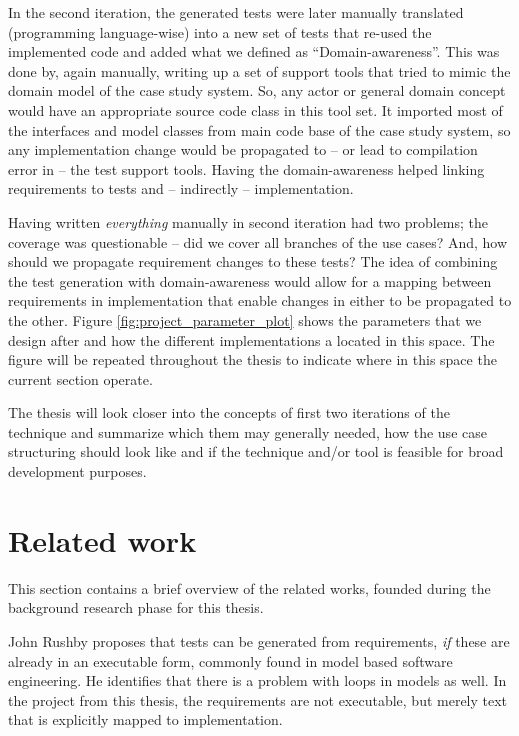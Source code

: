 \noindent In the second iteration, the generated tests were later manually translated (programming language-wise) into a new set of tests that re-used the implemented code and added what we defined as ``Domain-awareness''. This was done by, again manually, writing up a set of support tools that tried to mimic the domain model of the case study system. So, any actor or general domain concept would have an appropriate source code class in this tool set. It imported most of the interfaces and model classes from main code base of the case study system, so any implementation change would be propagated to -- or lead to compilation error in -- the test support tools. Having the domain-awareness helped linking requirements to tests and -- indirectly -- implementation.\medskip

\noindent Having written \emph{everything} manually in second iteration had two problems; the coverage was questionable -- did we cover all branches of the use cases? And, how should we propagate requirement changes to these tests? The idea of combining the test generation with domain-awareness would allow for a mapping between requirements in implementation that enable changes in either to be propagated to the other. Figure \ref{fig:project_parameter_plot} shows the parameters that we design after and how the different implementations a located in this space. The figure will be repeated throughout the thesis to indicate where in this space the current section operate.\medskip

\noindent The thesis will look closer into the concepts of first two iterations of the technique and summarize which them may generally needed, how the use case structuring should look like and if the technique and/or tool is feasible for broad development purposes.\medskip

\section{Related work}
This section contains a brief overview of the related works, founded during the background research phase for this thesis.\medskip

\noindent John Rushby\cite{rushby2008automated} proposes that tests can be generated from requirements, \emph{if} these are already in an executable form, commonly found in model based software engineering. He identifies that there is a problem with loops in models as well. In the project from this thesis, the requirements are not executable, but merely text that is explicitly mapped to implementation.\medskip

